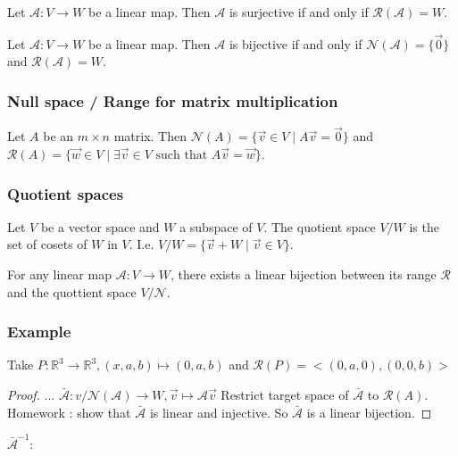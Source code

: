 \begin{theorem}
    Let $\mathcal{A}: V \to W$ be a linear map. Then $\mathcal{A}$ is surjective if and only if $\mathcal{R}(\mathcal{A}) = W$.
\end{theorem}

\begin{theorem}
    Let $\mathcal{A}: V \to W$ be a linear map. Then $\mathcal{A}$ is bijective if and only if $\mathcal{N}(\mathcal{A}) = \{\vec{0}\}$ and $\mathcal{R}(\mathcal{A}) = W$.
\end{theorem}

\subsubsection{Null space / Range for matrix multiplication}
\begin{theorem}
    Let $A$ be an $m \times n$ matrix. Then $\mathcal{N}(A) = \{\vec{v} \in V \mid A\vec{v} = \vec{0}\}$ and $\mathcal{R}(A) = \{\vec{w} \in V \mid \exists \vec{v} \in V \text{ such that } A\vec{v} = \vec{w}\}$.
\end{theorem}

\subsubsection{Quotient spaces}
\begin{definition}
    Let $V$ be a vector space and $W$ a subspace of $V$. The quotient space $V/W$ is the set of cosets of $W$ in $V$.
    I.e. $V/W = \{\vec{v} + W \mid \vec{v} \in V\}$.
\end{definition}

\begin{theorem}
    For any linear map $\mathcal{A}: V \to W$, there exists a linear bijection between its range $\mathcal{R}$ and the quottient space $V/\mathcal{N}$.
\end{theorem}

\subsubsection{Example}
Take $P: \mathbb{R}^3 \to \mathbb{R}^3, (x,a,b) \mapsto (0,a,b)$ and $\mathcal{R}(P) = <(0,a,0),(0,0,b)>$

\begin{proof}
    ... $\bar{\mathcal{A}}: v/\mathcal{N}(\mathcal{A}) \to W, \vec{v} \mapsto \mathcal{A}\vec{v}$
    Restrict target space of $\bar{\mathcal{A}}$ to $\mathcal{R}(A)$. Homework : show that $\bar{\mathcal{A}}$ is linear and injective.
    So $\bar{\mathcal{A}}$ is a linear bijection.
\end{proof}

$\bar{\mathcal{A}}^{-1}:$

